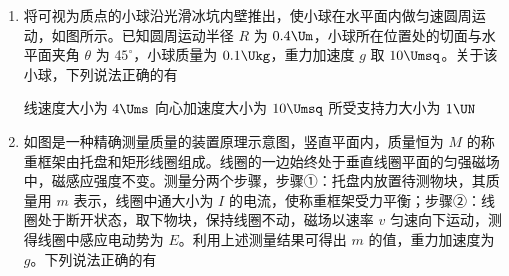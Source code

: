 \documentclass[\gkver]{gaokaozhenti}
\begin{document}
\begin{enumerate}
{$\frac{1}{2} \cdot 3m(4v)^{2} + \frac{1}{2} \cdot 2m(6v)^{2} > \frac{1}{2} \cdot 3mv_{1}^{2} + \frac{1}{2} \cdot 2mv_{2}^{2}$

则假设成立，因 M、N 的加速度大小之比仍为 $2:3$，则停止运动的时间之比为 $1:1$，对 M 来说碰撞前后的速度之比为 $4v:2v = 2:1$

可知碰撞前后运动时间之比为 $2:1$，可知 A 正确，C 错误。

故选 A。
}

\item
将可视为质点的小球沿光滑冰坑内壁推出，使小球在水平面内做匀速圆周运动，如图所示。已知圆周运动半径 $R$ 为 $0.4 \Um$，小球所在位置处的切面与水平面夹角 $\theta$ 为 $45^\circ$，小球质量为 $0.1 \Ukg$，重力加速度 $g$ 取 $10 \Umsq$。关于该小球，下列说法正确的有


{线速度大小为 $4 \Ums$}
{向心加速度大小为 $10 \Umsq$}
{所受支持力大小为 $1 \UN$}


\item
如图是一种精确测量质量的装置原理示意图，竖直平面内，质量恒为 $M$ 的称重框架由托盘和矩形线圈组成。线圈的一边始终处于垂直线圈平面的匀强磁场中，磁感应强度不变。测量分两个步骤，步骤①：托盘内放置待测物块，其质量用 $m$ 表示，线圈中通大小为 $I$ 的电流，使称重框架受力平衡；步骤②：线圈处于断开状态，取下物块，保持线圈不动，磁场以速率 $v$ 匀速向下运动，测得线圈中感应电动势为 $E$。利用上述测量结果可得出 $m$ 的值，重力加速度为 $g$。下列说法正确的有


\end{enumerate}
\end{document}
